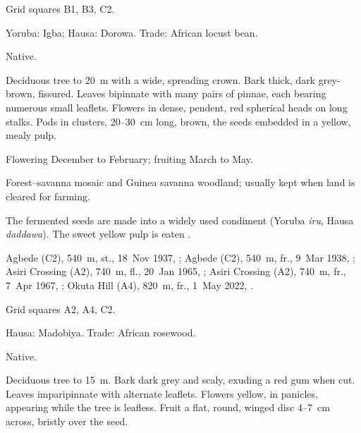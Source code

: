  Grid squares B1, B3, C2.

\begin{center}
\end{center}

\label{sp:FAB02}

 Yoruba: Igba; Hausa: Dorowa. Trade:
African locust bean.

 Native.

 Deciduous tree to 20~m with a wide, spreading
crown. Bark thick, dark grey-brown, fissured. Leaves bipinnate with
many pairs of pinnae, each bearing numerous small leaflets. Flowers in
dense, pendent, red spherical heads on long stalks. Pods in clusters,
20--30~cm long, brown, the seeds embedded in a yellow, mealy pulp.

 Flowering December to February; fruiting March to
May.

 Forest--savanna mosaic and Guinea savanna woodland;
usually kept when land is cleared for farming.

 The fermented seeds are made into a widely used condiment
(Yoruba \textit{iru}, Hausa \textit{daddawa}). The sweet yellow pulp
is eaten \citep{arbonnier2004,orwa2009}.

 Agbede (C2), 540~m, st., 18~Nov 1937, ;
Agbede (C2), 540~m, fr., 9~Mar 1938, ;
Asiri Crossing (A2), 740~m, fl., 20~Jan 1965, ;
Asiri Crossing (A2), 740~m, fr., 7~Apr 1967, ;
Okuta Hill (A4), 820~m, fr., 1~May 2022, .

 Grid squares A2, A4, C2.

\begin{center}
\end{center}

\label{sp:FAB03}

 Hausa: Madobiya. Trade: African
rosewood.

 Native.

 Deciduous tree to 15~m. Bark dark grey and scaly,
exuding a red gum when cut. Leaves imparipinnate with alternate
leaflets. Flowers yellow, in panicles, appearing while the tree is
leafless. Fruit a flat, round, winged disc 4--7~cm across, bristly
over the seed.

